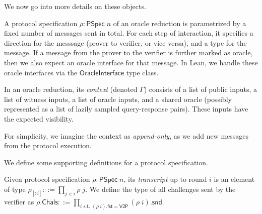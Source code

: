 We now go into more details on these objects.

\begin{definition}
    \label{def:oracle_reduction_type_signature}
    A protocol specification $\rho : \mathsf{PSpec}\; n$ of an oracle reduction is parametrized by a fixed number of messages sent in total. For each step of interaction, it specifies a direction for the messsage (prover to verifier, or vice versa), and a type for the message. If a message from the prover to the verifier is further marked as oracle, then we also expect an oracle interface for that message. In Lean, we handle these oracle interfaces via the $\mathsf{OracleInterface}$ type class.
\end{definition}

\begin{definition}[Context]\label{def:context}
    In an oracle reduction, its \emph{context} (denoted $\Gamma$) consists of a list of public inputs, a list of witness inputs, a list of oracle inputs, and a shared oracle (possibly represented as a list of lazily sampled query-response pairs). These inputs have the expected visibility.

For simplicity, we imagine the context as \emph{append-only}, as we add new messages from the protocol execution.
\end{definition}

We define some supporting definitions for a protocol specification.

\begin{definition}
    \label{def:transcript_and_related_defs}
    Given protocol specification $\rho : \mathsf{PSpec}\; n$, its \emph{transcript} up to round $i$ is an element of type $\rho_{[:i]} ::= \prod_{j < i} \rho\; j$. We define the type of all challenges sent by the verifier as $\rho.\mathsf{Chals} ::= \prod_{i \text{ s.t. } (\rho\; i).\mathsf{fst} = \mathsf{V2P}} (\rho\; i).\mathsf{snd}$.
\end{definition}


